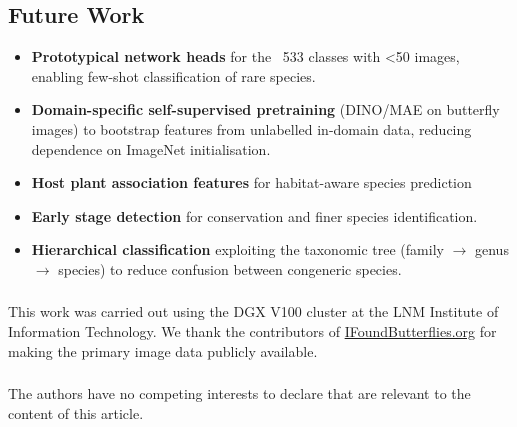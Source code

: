 \documentclass[runningheads]{llncs}
\begin{document}
\subsection{Future Work}
\begin{itemize}
    \item  \textbf{Prototypical network heads} for the ~533 classes with <50 images, enabling few-shot classification of rare species.
    \item  \textbf{Domain-specific self-supervised pretraining} (DINO/MAE on butterfly images) to bootstrap features from unlabelled in-domain data, reducing dependence on ImageNet initialisation.
    \item  \textbf{Host plant association features} for habitat-aware species prediction
    \item \textbf{Early stage detection} for conservation and finer species identification.
    \item  \textbf{Hierarchical classification} exploiting the taxonomic tree (family $\rightarrow$ genus $\rightarrow$ species) to reduce confusion between congeneric species.
\end{itemize}
\begin{credits}
\subsubsection{\ackname}
This work was carried out using the DGX V100 cluster at the LNM Institute of Information Technology. We thank the contributors of \href{https://www.ifoundbutterflies.org}{IFoundButterflies.org} for making the primary image data publicly available.

\subsubsection{\discintname}
The authors have no competing interests to declare that are relevant to the content of this article.
\end{credits}
%
%
%
% 
% 
%
\end{document}
